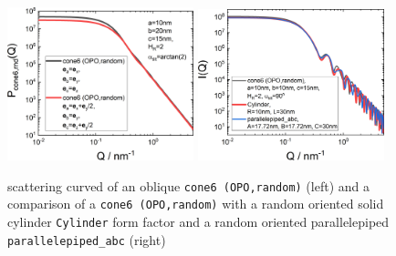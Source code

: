 \begin{figure}[htb]
\includegraphics[width=0.481\textwidth]{../images/form_factor/oriented_primitive_opbjects/cone6OPOoblique.png} \hfill
\includegraphics[width=0.481\textwidth]{../images/form_factor/oriented_primitive_opbjects/cone6OPOcompare.png}
\caption{scattering curved of an oblique \texttt{cone6 (OPO,random)} (left) and a comparison of a \texttt{cone6 (OPO,random)} with a random oriented solid cylinder \texttt{Cylinder} form factor and a random oriented parallelepiped \texttt{parallelepiped\_abc} (right)}
\label{fig:opo_cone6IQrandom}
\end{figure}

